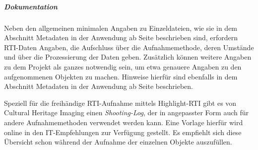 \subparagraph{Dokumentation} Neben den allgemeinen minimalen Angaben zu Einzeldateien, wie sie in dem Abschnitt Metadaten in der Anwendung ab Seite \pageref{Metadaten-anwendung} beschrieben sind, erfordern RTI-Daten Angaben, die Aufschluss über die Aufnahmemethode, deren Umstände und über die Prozessierung der Daten geben. Zusätzlich können weitere Angaben zu dem Projekt als ganzes notwendig sein, um etwa genauere Angaben zu den aufgenommenen Objekten zu machen. Hinweise hierfür sind ebenfalls in dem Abschnitt Metadaten in der Anwendung ab Seite \pageref{Metadaten-anwendung} beschrieben.

Speziell für die freihändige RTI-Aufnahme mittels Highlight-RTI gibt es von Cultural Heritage Imaging einen \emph{Shooting-Log}, der in angepasster Form auch für andere Aufnahmemethoden verwendet werden kann. Eine Vorlage hierfür wird online in den IT-Empfehlungen zur Verfügung gestellt. Es empfiehlt sich diese Übersicht schon während der Aufnahme der einzelnen Objekte auszufüllen.

